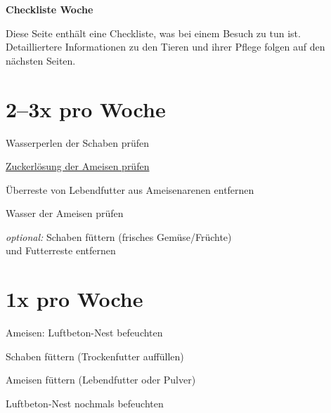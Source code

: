 \begin{center}
  \Huge{\textbf{Checkliste Woche \makebox[3cm]{\hrulefill}}}
\end{center}
Diese Seite enthält eine Checkliste, was bei einem Besuch zu tun ist.
Detailliertere Informationen zu den Tieren und ihrer Pflege folgen auf den nächsten Seiten.

\section*{2--3x pro Woche}
\begin{todolistx3}
  \item Wasserperlen der Schaben prüfen
  \item \hyperref[sec:Ameisen_sub:Zucker]{Zuckerlösung der Ameisen prüfen}
  \item Überreste von Lebendfutter aus Ameisenarenen entfernen
  \item Wasser der Ameisen prüfen
  \item
  \item
  \item
  \item \textit{optional:} Schaben füttern (frisches Gemüse/Früchte)\\und Futterreste entfernen
\end{todolistx3}

\section*{1x pro Woche}
\begin{todolist}
  \item Ameisen: Luftbeton-Nest befeuchten
  \item Schaben füttern (Trockenfutter auffüllen)
  \item Ameisen füttern (Lebendfutter oder Pulver)
  \item
  \item
  \item
  \item Luftbeton-Nest nochmals befeuchten
\end{todolist}

